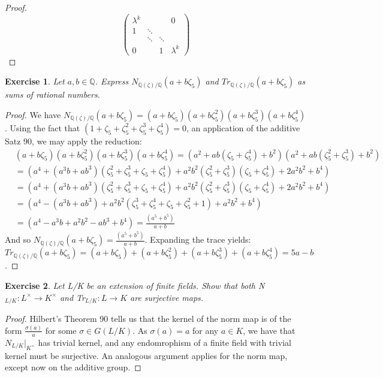 \documentclass{article}
\newcommand{\bb}[1]{\mathbb{#1}}
\newtheorem{exercise}{Exercise}
\begin{document}
\begin{proof}
      \[
        \begin{pmatrix}
      \lambda^{k}&  &  & 0 \\
        1 & \ddots & \\
         & \ddots & \ddots \\
     0 & & 1 & \lambda^{k} \end{pmatrix}
     \]
\end{proof}

\begin{exercise}
  Let $a,b \in \bb{Q}$. Express $N_{\bb{Q}(\zeta)/\bb{Q}}(a + b\zeta_{5})$ and $Tr_{\bb{Q}(\zeta)/\bb{Q}}(a + b\zeta_{5})$ as sums of rational numbers.
\end{exercise}
\begin{proof}
  We have $N_{\bb{Q}(\zeta)/\bb{Q}}(a + b\zeta_{5}) = (a + b\zeta_{5})(a + b\zeta_{5}^{2})(a + b\zeta_{5}^{3})(a + b\zeta_{5}^{4})$. Using the fact that $(1 + \zeta_{5} +\zeta_{5}^{2} + \zeta_{5}^{3} + \zeta_{5}^{4}) = 0$, an application of the additive Satz 90, we may apply the reduction:
  \begin{align*}
    &(a + b\zeta_{5})(a + b\zeta_{5}^{2})(a + b\zeta_{5}^{3})(a + b\zeta_{5}^{4})  =  (a^{2} + ab(\zeta_{5} + \zeta_{5}^{4}) +b^{2 })(a^{2} + ab(\zeta_{5}^{2} + \zeta_{5}^{3}) + b^{2}) \\
    &= (a^{4} + (a^{3}b +ab^{3})(\zeta_{5}^{2} + \zeta_{5}^{3} + \zeta_{5} + \zeta_{5}^{4}) + a^{2}b^{2}(\zeta_{5}^{2} + \zeta_{5}^{3})(\zeta_{5} + \zeta_{5}^{4}) + 2a^{2}b^{2} + b^{4}) \\
    &= (a^{4} + (a^{3}b +ab^{3})(\zeta_{5}^{2} + \zeta_{5}^{3} + \zeta_{5} + \zeta_{5}^{4}) + a^{2}b^{2}(\zeta_{5}^{2} + \zeta_{5}^{3})(\zeta_{5} + \zeta_{5}^{4}) + 2a^{2}b^{2} + b^{4}) \\
    &= (a^{4} - (a^{3}b +ab^{3}) + a^{2}b^{2}(\zeta_{5}^{3} + \zeta_{5}^{4} + \zeta_{5} + \zeta_{5}^{2} + 1) + a^{2}b^{2} + b^{4}) \\
    &= (a^{4} - a^{3}b + a^{2}b^{2} - ab^{3} + b^{4}) = \frac{(a^{5}+b^{5})}{a+b}
  \end{align*}
  And so $N_{\bb{Q}(\zeta)/\bb{Q}}(a + b\zeta_{5}) = \frac{(a^{5}+b^{5})}{a+b}$. Expanding the trace yields: $Tr_{\bb{Q}(\zeta)/\bb{Q}}(a + b\zeta_{5}) = (a + b\zeta_{5}) + (a + b\zeta_{5}^{2}) + (a + b\zeta_{5}^{3}) + (a + b\zeta_{5}^{4}) = 5a - b$. 
\end{proof}

\begin{exercise}
  Let L/K be an extension of finite fields. Show that both N$_{L/K}:L^{\times} \to K^{\times}$ and Tr$_{L/K}:L \to K$ are surjective maps.
\end{exercise}
\begin{proof}
  Hilbert's Theorem 90 tells us that the kernel of the norm map is of the form $\frac{\sigma(a)}{a}$ for some $\sigma \in G(L/K)$. As $\sigma(a) = a$ for any $a \in K$, we have that $N_{L/K}|_{K^{\times}}$ has trivial kernel, and any endomrophism of a finite field with trivial kernel must be surjective. An analogous argument applies for the norm map, except now on the additive group.
\end{proof}
\end{document}
